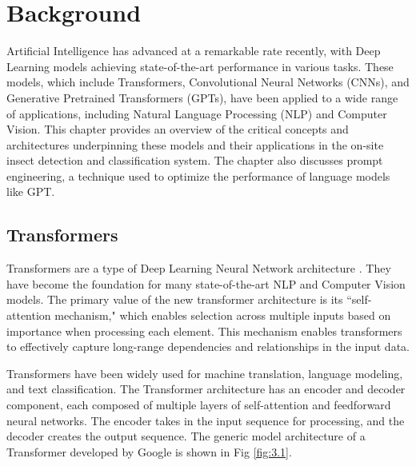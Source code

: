 
\chapter{Background}
Artificial Intelligence has advanced at a remarkable rate recently, with Deep Learning models achieving state-of-the-art performance in various tasks. These models, which include Transformers, Convolutional Neural Networks (CNNs), and Generative Pretrained Transformers (GPTs), have been applied to a wide range of applications, including Natural Language Processing (NLP) and Computer Vision. This chapter provides an overview of the critical concepts and architectures underpinning these models and their applications in the on-site insect detection and classification system. The chapter also discusses prompt engineering, a technique used to optimize the performance of language models like GPT.

\section{Transformers}
Transformers are a type of Deep Learning Neural Network architecture \cite{transformers_1}. They have become the foundation for many state-of-the-art NLP and Computer Vision models. The primary value of the new transformer architecture is its ``self-attention mechanism," which enables selection across multiple inputs based on importance when processing each element. This mechanism enables transformers to effectively capture long-range dependencies and relationships in the input data.

Transformers have been widely used for machine translation, language modeling, and text classification. The Transformer architecture has an encoder and decoder component, each composed of multiple layers of self-attention and feedforward neural networks. The encoder takes in the input sequence for processing, and the decoder creates the output sequence. The generic model architecture of a Transformer developed by Google is shown in Fig \ref{fig:3.1}.

